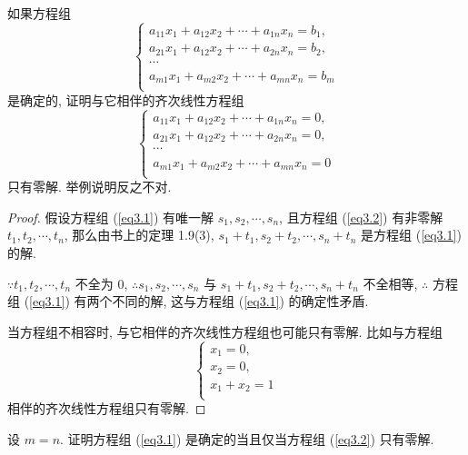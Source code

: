 \documentclass{ctexart}
\begin{document}
\begin{exercisec}[1.10]\label{exc1.10}
    如果方程组
    \begin{equation}\label{eq3.1}
        \begin{cases}
            a_{11}x_1+a_{12}x_2+\cdots+a_{1n}x_n=b_1, \\
            a_{21}x_1+a_{12}x_2+\cdots+a_{2n}x_n=b_2, \\
            \cdots \\
            a_{m1}x_1+a_{m2}x_2+\cdots+a_{mn}x_n=b_m \\
        \end{cases}
    \end{equation}
    是确定的, 证明与它相伴的齐次线性方程组
    \begin{equation}\label{eq3.2}
        \begin{cases}
            a_{11}x_1+a_{12}x_2+\cdots+a_{1n}x_n=0, \\
            a_{21}x_1+a_{12}x_2+\cdots+a_{2n}x_n=0, \\
            \cdots \\
            a_{m1}x_1+a_{m2}x_2+\cdots+a_{mn}x_n=0 \\
        \end{cases}
    \end{equation}
    只有零解. 举例说明反之不对.
\end{exercisec}
\begin{proof}
    假设方程组 (\ref{eq3.1}) 有唯一解 $s_1,s_2,\cdots,s_n$, 且方程组 (\ref{eq3.2}) 有非零解 $t_1,t_2,\cdots,t_n$, 那么由书上的定理 1.9(3), $s_1+t_1,s_2+t_2,\cdots,s_n+t_n$ 是方程组 (\ref{eq3.1}) 的解.
    
    $\because t_1,t_2,\cdots,t_n$ 不全为 $0$, $\therefore s_1,s_2,\cdots,s_n$ 与 $s_1+t_1,s_2+t_2,\cdots,s_n+t_n$ 不全相等, $\therefore$ 方程组 (\ref{eq3.1}) 有两个不同的解, 这与方程组 (\ref{eq3.1}) 的确定性矛盾.

    当方程组不相容时, 与它相伴的齐次线性方程组也可能只有零解. 比如与方程组
    \[\begin{cases}
        x_1=0, \\
        x_2=0, \\
        x_1+x_2=1 \\
    \end{cases}\]
    相伴的齐次线性方程组只有零解.
\end{proof}
\begin{exercisec}[1.11]
    设 $m=n$. 证明方程组 (\ref{eq3.1}) 是确定的当且仅当方程组 (\ref{eq3.2}) 只有零解.
\end{exercisec}
\end{document}
